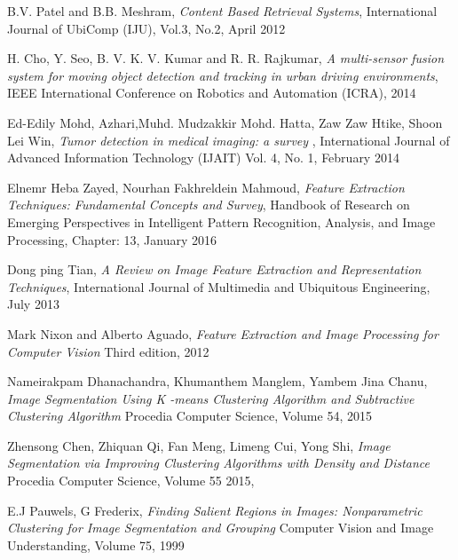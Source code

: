 \documentclass{usiinftr}
\begin{document}
\newpage
\begin{thebibliography}{1}
	
	
	B.V. Patel and B.B. Meshram,
	\textit{Content Based Retrieval Systems},
	International Journal of UbiComp (IJU), Vol.3, No.2, 
	April 2012
	
	H. Cho, Y. Seo, B. V. K. V. Kumar and R. R. Rajkumar, 
	\textit{A multi-sensor fusion system for moving object detection and tracking in urban driving environments}, 
	IEEE International Conference on Robotics and Automation (ICRA), 
	2014
	
	Ed-Edily Mohd,  Azhari,Muhd. Mudzakkir Mohd. Hatta, Zaw Zaw Htike,  Shoon Lei Win, 
	\textit{Tumor detection in medical imaging: a survey }, 
	International Journal of Advanced Information Technology (IJAIT) Vol. 4, No. 1, 
	February 2014
	
		Elnemr Heba Zayed, Nourhan Fakhreldein Mahmoud, 
		\textit{Feature Extraction Techniques: Fundamental Concepts and Survey},
		Handbook of Research on Emerging Perspectives in Intelligent Pattern Recognition, Analysis, and Image Processing, Chapter: 13,
		January 2016
		
		Dong ping  Tian, 
		\textit{A Review on Image Feature Extraction and Representation Techniques},
		International Journal of Multimedia and Ubiquitous Engineering,
		July 2013
		
		Mark Nixon and Alberto Aguado, 
		\textit{Feature Extraction and Image Processing for Computer Vision} Third edition,
		2012
		
		Nameirakpam Dhanachandra, Khumanthem Manglem, Yambem Jina Chanu,  
		\textit{Image Segmentation Using K -means Clustering Algorithm and Subtractive Clustering Algorithm} 
		Procedia Computer Science, Volume 54,
		2015
		
		Zhensong Chen, Zhiquan Qi, Fan Meng, Limeng Cui, Yong Shi,
		\textit{Image Segmentation via Improving Clustering Algorithms with Density and Distance} 
		Procedia Computer Science,
Volume 55
		2015,
		
		E.J Pauwels, G Frederix,
		\textit{Finding Salient Regions in Images: Nonparametric Clustering for Image Segmentation and Grouping} 
		Computer Vision and Image Understanding, Volume 75,
		1999
	

\end{thebibliography}
\end{document}
